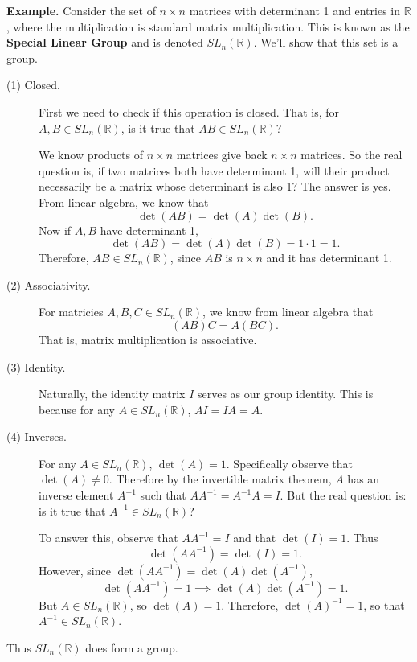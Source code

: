 \documentclass[12pt,letterpaper]{algebra_book}
\theoremstyle{definition}
\begin{document}
\noindent
\textbf{Example.}
Consider the set of $n \times n$ matrices with determinant 1 and entries in $\mathbb{R}$, where
the multiplication is standard matrix multiplication. This is
known as the \textbf{Special Linear Group} and is denoted
$SL_n(\mathbb{R})$. We'll show that this set is a group.
\begin{description}
    \item[(1) Closed.] First we need to check if this operation is
    closed. That is, for $A, B \in SL_n(\mathbb{R})$, is it true that
    $AB \in SL_n(\mathbb{R})$?

    We know products of $n \times n$ matrices give
    back $n \times n$ matrices. So the real question is, 
    if two matrices both have
    determinant 1, will their product necessarily be a matrix
    whose determinant is also 1? 
    The answer is yes. From linear algebra, we know that 
    \[
        \det(AB) = \det(A)\det(B).
    \]
    Now if $A, B$ have determinant 1, 
    \[
        \det(AB) = \det(A)\det(B) = 1 \cdot 1 = 1.   
    \]
    Therefore, $AB \in SL_n(\mathbb{R})$, since $AB$ is $n \times n$
    and it has determinant 1.


    \item[(2) Associativity.] For matricies $A, B, C \in
    SL_n(\mathbb{R})$, we know from linear algebra that 
    \[
        (AB)C = A(BC).
    \]
    That is, matrix multiplication is associative.

    \item[(3) Identity.] Naturally, the identity matrix $I$ serves as
    our group identity. This is because for any $A \in
    SL_n(\mathbb{R})$, $AI = IA = A$.

    \item[(4) Inverses.] For any $A \in SL_n(\mathbb{R})$, $\det(A) =
    1$. Specifically observe that $\det(A) \ne 0$. Therefore by the 
    invertible matrix theorem, $A$
    has an inverse element $A^{-1}$ such that $AA^{-1} = A^{-1}A = I$.
    But the real question is: is it true that $A^{-1} \in SL_n(\mathbb{R})$? 
    
    To answer this, observe that $AA^{-1} = I$
    and that $\det(I) = 1$. Thus 
    \[ 
        \det(AA^{-1}) = \det(I) = 1.
    \]
    However, since $\det(AA^{-1}) = \det(A)\det(A^{-1})$,
    \[
        \det(AA^{-1}) = 1 \implies \det(A)\det(A^{-1}) = 1.
    \] 
    But $A \in SL_n(\mathbb{R})$, so $\det(A) = 1$. Therefore,
    $\det(A)^{-1} = 1$, so that $A^{-1} \in SL_n(\mathbb{R})$. 
\end{description}
Thus $SL_n(\mathbb{R})$ does form a group. 
\end{document}
